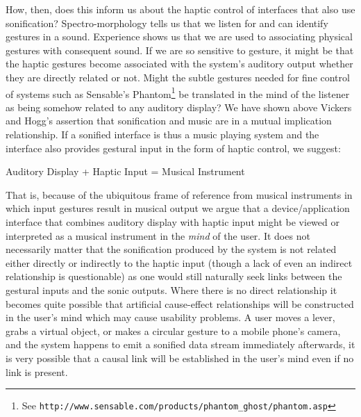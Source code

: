 \documentclass[runningheads]{llncs}
\begin{document}
How, then, does this inform us about the haptic control of interfaces that also use sonification? Spectro-morphology tells us that we listen for and can identify gestures in a sound. Experience shows us that we are used to associating physical gestures with consequent sound. If we are so sensitive to gesture, it might be that the haptic gestures become associated with the system's auditory output whether they are directly related or not. Might the subtle gestures needed for fine control of systems such as Sensable's Phantom\footnote{See \texttt{http://www.sensable.com/products/phantom\_ghost/phantom.asp}} be translated in the mind of the listener as being somehow related to any auditory display? We have shown above Vickers and Hogg's assertion that sonification and music are in a mutual implication relationship. If a sonified interface is thus a music playing system and the interface also provides gestural input in the form of haptic control, we suggest:
\begin{lemma}Auditory Display + Haptic Input = Musical Instrument\end{lemma}
That is, because of the ubiquitous frame of reference from musical instruments in which input gestures result in musical output we argue that a device/application interface that combines auditory display with haptic input might be viewed or interpreted as a musical instrument in the \emph{mind} of the user. It does not necessarily matter that the sonification produced by the system is not related either directly or indirectly to the haptic input (though a lack of even an indirect relationship is questionable) as one would still naturally seek links between the gestural inputs and the sonic outputs. Where there is no direct relationship it becomes quite possible that artificial cause-effect relationships will be constructed in the user's mind which may cause usability problems. A user moves a lever, grabs a virtual object, or makes a circular gesture to a mobile phone's camera, and the system happens to emit a sonified data stream immediately afterwards, it is very possible that a causal link will be established in the user's mind even if no link is present. 
\end{document}

